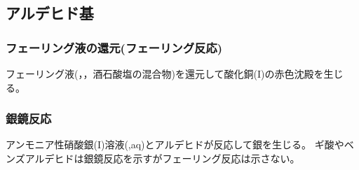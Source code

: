 \subsection{アルデヒド基}

\subsubsection*{フェーリング液の還元(フェーリング反応)}
フェーリング液(，，酒石酸塩の混合物)を還元して酸化銅(I)の赤色沈殿を生じる。
\subsubsection*{銀鏡反応}
アンモニア性硝酸銀(I)溶液(,aq)とアルデヒドが反応して銀を生じる。
ギ酸やベンズアルデヒドは銀鏡反応を示すがフェーリング反応は示さない。
